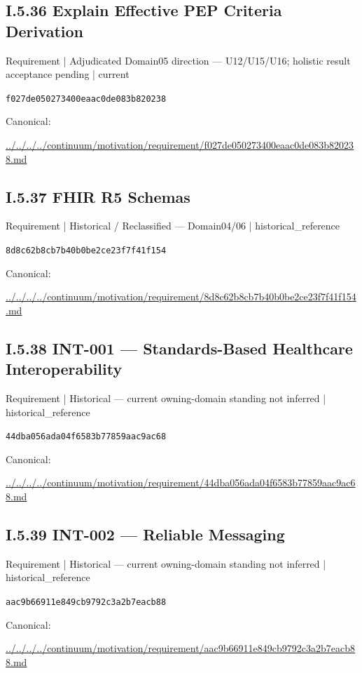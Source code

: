 \documentclass[10pt,a4paper]{article}
\begin{document}
\subsection*{I.5.36 Explain Effective PEP Criteria Derivation}
\label{element-f027de050273400eaac0de083b820238}
{\small Requirement | Adjudicated Domain05 direction — U12/U15/U16; holistic result acceptance pending | current}\par
\texttt{f027de050273400eaac0de083b820238}\par
Canonical: \par
{\footnotesize\url{../../../../continuum/motivation/requirement/f027de050273400eaac0de083b820238.md}}\par
\subsection*{I.5.37 FHIR R5 Schemas}
\label{element-8d8c62b8cb7b40b0be2ce23f7f41f154}
{\small Requirement | Historical / Reclassified — Domain04/06 | historical\_reference}\par
\texttt{8d8c62b8cb7b40b0be2ce23f7f41f154}\par
Canonical: \par
{\footnotesize\url{../../../../continuum/motivation/requirement/8d8c62b8cb7b40b0be2ce23f7f41f154.md}}\par
\subsection*{I.5.38 INT-001 — Standards-Based Healthcare Interoperability}
\label{element-44dba056ada04f6583b77859aac9ac68}
{\small Requirement | Historical — current owning-domain standing not inferred | historical\_reference}\par
\texttt{44dba056ada04f6583b77859aac9ac68}\par
Canonical: \par
{\footnotesize\url{../../../../continuum/motivation/requirement/44dba056ada04f6583b77859aac9ac68.md}}\par
\subsection*{I.5.39 INT-002 — Reliable Messaging}
\label{element-aac9b66911e849cb9792c3a2b7eacb88}
{\small Requirement | Historical — current owning-domain standing not inferred | historical\_reference}\par
\texttt{aac9b66911e849cb9792c3a2b7eacb88}\par
Canonical: \par
{\footnotesize\url{../../../../continuum/motivation/requirement/aac9b66911e849cb9792c3a2b7eacb88.md}}\par
\end{document}
